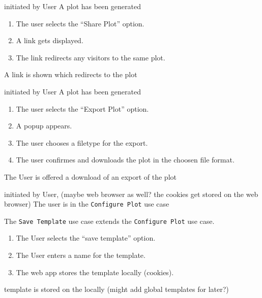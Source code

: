 \bigskip

{initiated by User}
{A \gls{plot} has been generated}
{\begin{enumerate}
    \item The user selects the \enquote{Share Plot} option.
    \item A link gets displayed.
    \item The link redirects any visitors to the same \gls{plot}.
\end{enumerate}} 
{A link is shown which redirects to the \gls{plot}}

\bigskip

{initiated by User}
{A \gls{plot} has been generated}
{\begin{enumerate}
    \item The user selects the \enquote{Export Plot} option.
    \item A popup appears.
    \item The user chooses a filetype for the export.
    \item The user confirmes and downloads the \gls{plot} in the choosen file format.
\end{enumerate}} 
{The User is offered a download of an export of the \gls{plot}}

\bigskip

{initiated by User, (maybe web browser as well? the cookies get stored on the web browser)}
{The user is in the \texttt{Configure Plot} use case}
{The \texttt{Save Template} use case extends the \texttt{Configure Plot} use case.
\begin{enumerate}
    \item The User selects the \enquote{save template} option.
    \item The User enters a name for the \gls{template}.
    \item The web app stores the template locally (cookies).
\end{enumerate}} 
{\Gls{template} is stored on the locally (might add global templates for later?)}

\bigskip


